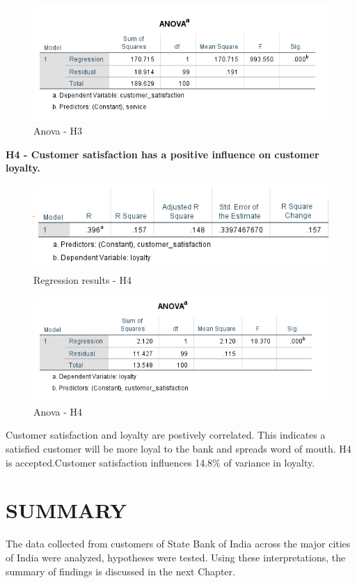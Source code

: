 \documentclass[a4paper, 14pt]{article}
\begin{document}
{\begin{figure}[H]
\centering
\includegraphics[scale=1]{anova_css.png}
\caption{Anova - H3}
\end{figure}

\newpage
\par \textbf{H4 - Customer satisfaction has a positive influence on customer loyalty.}\\
\begin{figure}[H]
\centering
\includegraphics[scale=1]{customer_satisfaction_vs_loyalty.png}
\caption{Regression results - H4}
\end{figure}
\begin{figure}[H]
\centering
\includegraphics[scale=1]{anova_cs_lo.png}
\caption{Anova - H4}
\end{figure}

Customer satisfaction and loyalty are postively correlated. This indicates a satisfied customer will be more loyal to the bank and spreads word of mouth. H4 is accepted.Customer satisfaction influences 14.8\% of variance in loyalty.

\section{SUMMARY}
The data collected from customers of State Bank of India across the major cities of India were analyzed, hypotheses were tested. Using these interpretations, the summary of findings is discussed in the next Chapter.

}
\end{document}
